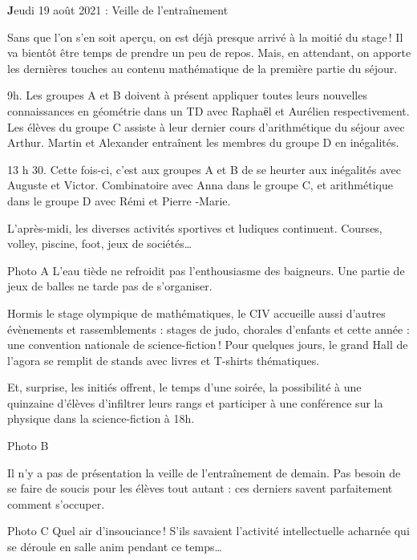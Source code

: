 \begin{center}
{\textbf Jeudi 19 août 2021 : Veille de l’entraînement}
\end{center}
\vspace{2mm}

Sans que l’on s’en soit aperçu, on est déjà presque arrivé à la moitié du stage ! Il va bientôt être temps de prendre un peu de repos. Mais, en attendant, on apporte les dernières touches au contenu mathématique de la première partie du séjour.

9h. Les groupes A et B doivent à présent appliquer toutes leurs nouvelles connaissances en géométrie dans un TD avec Raphaёl et Aurélien respectivement. Les élèves du groupe C assiste à leur dernier cours d’arithmétique du séjour avec Arthur. Martin et Alexander entraînent les membres du groupe D en inégalités.

13 h 30. Cette fois-ci, c’est aux groupes A et B de se heurter aux inégalités avec Auguste et Victor. Combinatoire avec Anna dans le groupe C, et arithmétique dans le groupe D avec Rémi et Pierre -Marie.

L’après-midi, les diverses activités sportives et ludiques continuent. Courses, volley, piscine, foot, jeux de sociétés…

Photo A
L’eau tiède ne refroidit pas l’enthousiasme des baigneurs. Une partie de jeux de balles ne tarde pas de s’organiser.

Hormis le stage olympique de mathématiques, le CIV accueille aussi d’autres évènements et rassemblements : stages de judo, chorales d’enfants et cette année : une convention nationale de science-fiction ! Pour quelques jours, le grand Hall de l’agora se remplit de stands avec livres et T-shirts thématiques.

Et, surprise, les initiés offrent, le temps d’une soirée, la possibilité à une quinzaine d’élèves d’infiltrer leurs rangs et participer à une conférence sur la physique dans la science-fiction à 18h.

Photo B

Il n’y a pas de présentation la veille de l’entraînement de demain. Pas besoin de se faire de soucis pour les élèves tout autant : ces derniers savent parfaitement comment s’occuper.

Photo C
Quel air d’insouciance ! S’ils savaient l'activité intellectuelle acharnée qui se déroule en salle anim pendant ce temps…